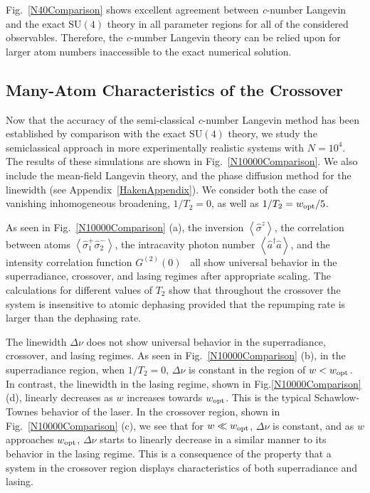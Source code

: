 \documentclass[aps,
twocolumn,
showpacs,
superscriptaddress,groupedaddress]{revtex4}
\begin{document}
Fig.~\ref{N40Comparison} shows excellent agreement between
\textit{c}-number Langevin and the exact $\mathrm{SU}(4)$ theory in all
parameter regions for all of the considered observables.  Therefore, the
\textit{c}-number Langevin theory can be relied upon for larger atom
numbers inaccessible to the exact numerical solution.


\subsection{Many-Atom Characteristics of the Crossover}

Now that the accuracy of the semi-classical \textit{c}-number Langevin
method has been established by comparison with the exact $\mathrm{SU}(4)$ theory,
we study the semiclassical approach in more experimentally realistic
systems with $N=10^4$. The results of these simulations are shown in
Fig.~\ref{N10000Comparison}.  We also include the mean-field Langevin
theory, and the phase diffusion method for the linewidth (see
Appendix~\ref{HakenAppendix}). We consider both the case of vanishing
inhomogeneous broadening, $1/T_2=0$, as well as $1/T_2=w_{\rm opt}/5$.

As seen in Fig.~\ref{N10000Comparison} (a), the inversion
$\left<\hat{\sigma}^{z}\right>$, the correlation between atoms
$\left<\hat{\sigma}_{1}^{+} \hat{\sigma}_{2}^{-}\right>$, the
intracavity photon number $\left<\hat{a}^{\dagger}\hat{a}\right>$, and
the intensity correlation function
$G^{(2)}(0)$~\cite{meystre2007elements} all show universal behavior in
the superradiance, crossover, and lasing regimes after appropriate
scaling.  The calculations for different values of $T_2$ show that
throughout the crossover the system is insensitive to atomic dephasing
provided that the repumping rate is larger than the dephasing rate.

The linewidth $\Delta \nu$ does not show universal behavior in the
superradiance, crossover, and lasing regimes. As seen in
Fig.~\ref{N10000Comparison} (b), in the superradiance region, when
$1/T_2=0$, $\Delta \nu$ is constant in the region of $w<w_{\rm opt}$.
In contrast, the linewidth in the lasing regime, shown in
Fig.\ref{N10000Comparison} (d), linearly decreases as $w$ increases
towards $w_{\rm opt}$. This is the typical Schawlow-Townes behavior of
the laser. In the crossover region, shown in
Fig.~\ref{N10000Comparison} (c), we see that for $w\ll w_{\rm opt}$,
$\Delta \nu$ is constant, and as $w$ approaches $w_{\rm opt}$,
$\Delta \nu$ starts to linearly decrease in a similar manner to its
behavior in the lasing regime. This is a consequence of the property
that a system in the crossover region displays characteristics of both
superradiance and lasing.
\end{document}

